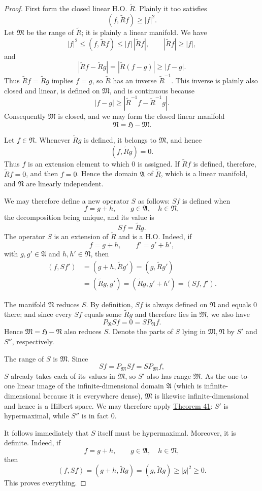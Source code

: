 ﻿\documentclass[paper=b5,fontsize=13pt,bookmarkpackage=false,twoside]{scrartcl}
\begin{document}
\begin{proof}
First form the closed linear H.O. $\widetilde R$. Plainly it too satisfies
\[
(f,\widetilde Rf)\ge|f|^2.
\]
Let $\mathfrak M$ be the range of $\widetilde R$; it is plainly a linear manifold. We have
\[
|f|^2\le(f,\widetilde Rf)\le|f|\,|\widetilde Rf|,
\qquad
|\widetilde Rf|\ge|f|,
\]
and
\[
|\widetilde Rf-\widetilde Rg|
=|\widetilde R(f-g)|\ge|f-g|.
\]
Thus $\widetilde Rf=\widetilde Rg$ implies $f=g$, so $\widetilde R$ has an inverse $\widetilde R^{-1}$. This inverse is plainly also closed and linear, is defined on $\mathfrak M$, and is continuous because
\[
|f-g|\ge
|\widetilde R^{-1}f-\widetilde R^{-1}g|.
\]
Consequently $\mathfrak M$ is closed, and we may form the closed linear manifold
\[
\mathfrak N=\mathfrak H-\mathfrak M.
\]

Let $f\in\mathfrak N$. Whenever $\widetilde Rg$ is defined, it belongs to $\mathfrak M$, and hence
\[
(f,\widetilde Rg)=0.
\]
Thus $f$ is an extension element to which $0$ is assigned. If $\widetilde Rf$ is defined, therefore, $\widetilde Rf=0$, and then $f=0$. Hence the domain $\mathfrak A$ of $\widetilde R$, which is a linear manifold, and $\mathfrak N$ are linearly independent.

We may therefore define a new operator $S$ as follows: $Sf$ is defined when
\[
f=g+h,\qquad g\in\mathfrak A,\quad h\in\mathfrak N,
\]
the decomposition being unique, and its value is
\[
Sf=\widetilde Rg.
\]
The operator $S$ is an extension of $\widetilde R$ and is a H.O. Indeed, if
\[
f=g+h,\qquad f'=g'+h',
\]
with $g,g'\in\mathfrak A$ and $h,h'\in\mathfrak N$, then
\begin{align*}
(f,Sf')
 &=(g+h,\widetilde Rg')
  =(g,\widetilde Rg')\\
 &=(\widetilde Rg,g')
  =(\widetilde Rg,g'+h')
  =(Sf,f').
\end{align*}

The manifold $\mathfrak N$ reduces $S$. By definition, $Sf$ is always defined on $\mathfrak N$ and equals $0$ there; and since every $Sf$ equals some $\widetilde Rg$ and therefore lies in $\mathfrak M$, we also have
\[
P_{\mathfrak N}Sf=0=SP_{\mathfrak N}f.
\]
Hence $\mathfrak M=\mathfrak H-\mathfrak N$ also reduces $S$. Denote the parts of $S$ lying in $\mathfrak M,\mathfrak N$ by $S'$ and $S''$, respectively.

The range of $S$ is $\mathfrak M$. Since
\[
Sf=P_{\mathfrak M}Sf=SP_{\mathfrak M}f,
\]
$S$ already takes each of its values in $\mathfrak M$, so $S'$ also has range $\mathfrak M$. As the one-to-one linear image of the infinite-dimensional domain $\mathfrak A$ (which is infinite-dimensional because it is everywhere dense), $\mathfrak M$ is likewise infinite-dimensional and hence is a Hilbert space. We may therefore apply \hyperref[thm:41]{Theorem 41}: $S'$ is hypermaximal, while $S''$ is in fact $0$.

It follows immediately that $S$ itself must be hypermaximal. Moreover, it is definite. Indeed, if
\[
f=g+h,\qquad g\in\mathfrak A,\quad h\in\mathfrak N,
\]
then
\[
(f,Sf)=(g+h,\widetilde Rg)
=(g,\widetilde Rg)\ge|g|^2\ge0.
\]
This proves everything.
\end{proof}
\end{document}
